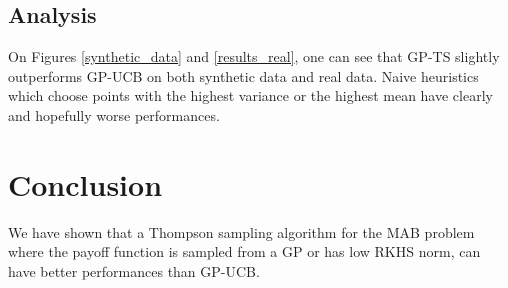 \documentclass{article} %
\begin{document}
\subsection{Analysis}

On Figures \ref{synthetic_data} and \ref{results_real}, one can see that GP-TS slightly outperforms GP-UCB on both synthetic data and real data. Naive heuristics which choose points with the highest variance or the highest mean have clearly and hopefully worse performances.


\section{Conclusion}

We have shown that a Thompson sampling algorithm for the MAB problem where the payoff function is sampled from a GP or has low RKHS norm, can have better performances than GP-UCB.



\end{document}
